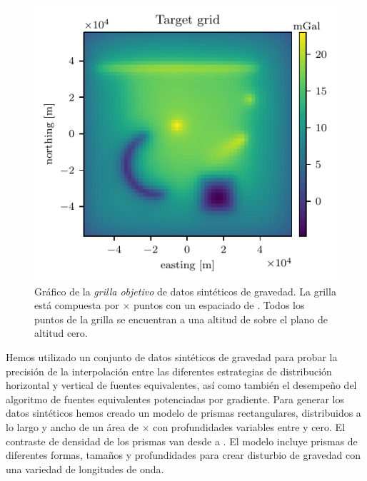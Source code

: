 \begin{figure}[tb]
    \centering
    \includegraphics[width=0.7\linewidth]{figs/eql-gradient-boosted/target-grid.pdf}
    \caption{
        Gráfico de la \emph{grilla objetivo} de datos sintéticos de gravedad.
        La grilla está compuesta por
        \TargetEastingSize{}$\times$\TargetNorthingSize{} puntos
        con un espaciado de \TargetSpacing{}.
        Todos los puntos de la grilla se encuentran a una altitud de
        \TargetHeight{} sobre el plano de altitud cero.
    }
    \label{fig:synthetic-target}
\end{figure}

Hemos utilizado un conjunto de datos sintéticos de gravedad para probar la
precisión de la interpolación entre las diferentes estrategias de distribución
horizontal y vertical de fuentes equivalentes, así como también el desempeño
del algoritmo de fuentes equivalentes potenciadas por gradiente.
Para generar los datos sintéticos hemos creado un modelo de
\NPrisms{} prismas rectangulares, distribuidos a lo largo y ancho de un área de
\ModelEasting{}$\times$\ModelNorthing{} con profundidades variables entre
\ModelDepth{} y cero.
El contraste de densidad de los prismas van desde \ModelMinDensity{} a
\ModelMaxDensity{}.
El modelo incluye prismas de diferentes formas, tamaños y profundidades para
crear disturbio de gravedad con una variedad de longitudes de onda.

